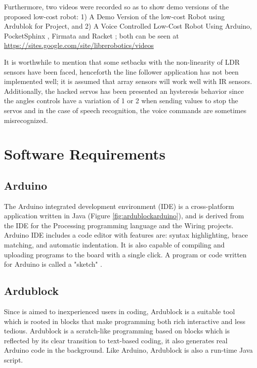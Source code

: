 Furthermore, two videos were recorded so as to show demo versions of the proposed 
low-cost robot: 1) A Demo Version of the low-cost Robot using Ardublok for {\librER}  
Project, and 2)  A Voice Controlled Low-Cost Robot Using Arduino, 
PocketSphinx \cite{Pocketsphinx}, 
Firmata \cite{DrFirmata}
and Racket \cite{Racket}; 
both can be seen at \url{https://sites.google.com/site/librerobotics/videos}
 
It is worthwhile to mention that some setbacks with the non-linearity of LDR sensors 
have been faced, henceforth the line follower application has not been implemented well;
it is assumed that array sensors will work well with IR sensors. Additionally, 
the hacked servos has been presented an hysteresis behavior since the angles controls 
have a variation of 1 or 2 when sending values to stop the servos and in the case of 
speech recognition, the voice commands are sometimes misrecognized. 
 
\section{Software Requirements}

\subsection{Arduino}
The Arduino integrated development environment (IDE) is a cross-platform application 
written in Java (Figure \ref{fig:ardublockarduino}), and is derived from the IDE for 
the Processing programming language and the Wiring projects. Arduino IDE includes a code 
editor with features are: syntax highlighting, brace matching, and automatic 
indentation. It is also capable of compiling and uploading programs to the board with 
a single click. A program or code written for Arduino is called a "sketch" \cite{arduino}.

\subsection{Ardublock}
Since {\librER} is aimed to inexperienced users in coding, Ardublock is a suitable tool
which is rooted in blocks that make programming both rich interactive and less tedious. 
Ardublock is a scratch-like programming based on blocks which is reflected by its clear 
transition to text-based coding, it also generates real Arduino code in the background.
Like Arduino, Ardublock is also a run-time Java script.


